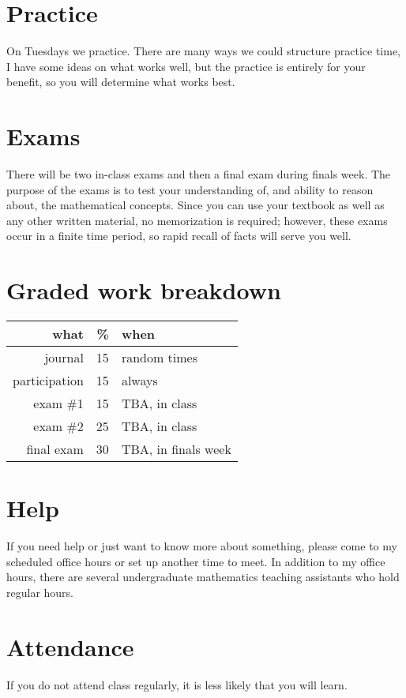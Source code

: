 \documentclass[12pt]{article}
\begin{document}
\section*{Practice}
On Tuesdays we practice.  There are many ways we could structure practice time, I have some ideas on what works well, but the practice is
entirely for your benefit, so you will determine what works best.

\section*{Exams}
There will be two in-class exams and then a final exam during finals week. 
The purpose of the exams is to test your understanding of, and ability to reason about, the mathematical concepts. 
Since you can use your textbook as well as any other written material, no memorization is required; however, 
these exams occur in a finite time period, so rapid recall of facts will serve you well. 

\section*{Graded work breakdown}
\begin{tabular}{r | r | l}
what & \% & when \\
\hline
journal & 15 & random times \\
participation & 15 & always\\
exam \#1 & 15 & TBA, in class \\
exam \#2 & 25 & TBA, in class \\
final exam & 30 & TBA, in finals week \\
\end{tabular}

\section*{Help}
If you need help or just want to know more about something, please come to my scheduled office hours or set up another time to meet. 
In addition to my office hours, there are several undergraduate mathematics teaching assistants who hold regular hours.

\section*{Attendance}
If you do not attend class regularly, it is less likely that you will learn.
\end{document}
